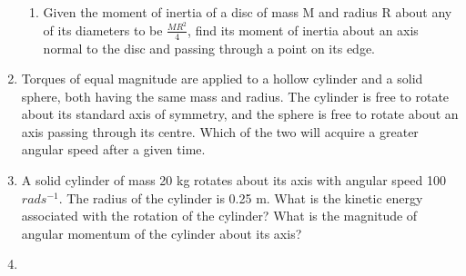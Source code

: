 \begin{enumerate}[label=\arabic*.,ref=\thesubsection.\theenumi]
\begin{enumerate}[label=(\alph*)]
\item  Given the moment of inertia of a disc of mass M and radius R about any of its diameters to be $\frac{MR^2}{4}$, find its moment of inertia about an axis normal to the
disc and passing through a point on its edge. 
\end{enumerate}
\item Torques of equal magnitude are applied to a hollow cylinder and a solid sphere, both having the same mass and radius. The cylinder is free to rotate about its standard axis of symmetry, and the sphere is free to rotate about an axis passing through its centre. Which of the two will acquire a greater angular speed after a given time.
\item A solid cylinder of mass 20 kg rotates about its axis with angular speed 100 $rad s^{-1}$. The radius of the cylinder is 0.25 m. What is the kinetic energy associated with the rotation of the cylinder? What is the magnitude of angular momentum of the cylinder about its axis?
\item 
\begin{enumerate}[label=(\alph*)]


\end{enumerate}
\end{enumerate}
